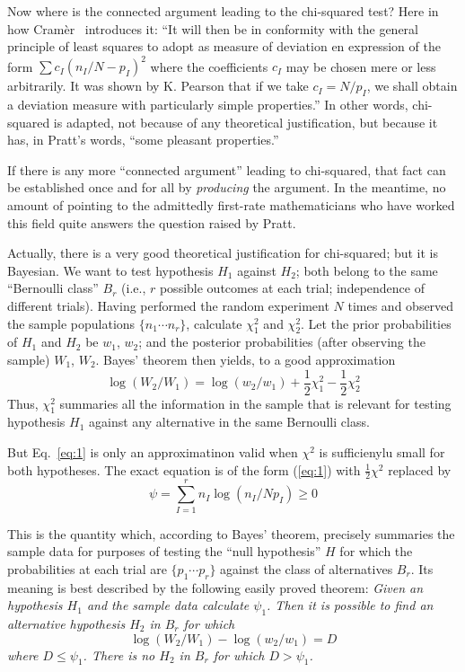 \documentclass[12pt]{article}
\newcommand{\refeq}[1]{Eq.~\ref{#1}}
\newcommand{\refnum}[1]{(\ref{#1})}
\let\oldcite\cite
\renewcommand{\cite}{~\oldcite}
\begin{document}
Now where is the connected argument leading to the chi-squared
test? Here in how Cram\`{e}r\cite{cramer} introduces it: ``It will then be in
conformity with the general principle of least squares to adopt as
measure of deviation en expression of the form $\sum c_I (n_I/N -p_I)^2$ where
the coefficients $c_I$ may be chosen mere or less arbitrarily. It was
shown by K. Pearson that if we take $c_I = N /p_I$, we shall obtain a
deviation measure with particularly simple properties.'' In other words,
chi-squared is adapted, not because of any theoretical justification,
but because it has, in Pratt's words, ``some pleasant properties.''

If there is any more ``connected argument'' leading to chi-squared, that fact can be established once and for all by
\emph{producing} the argument. In the meantime, no amount of pointing to the admittedly first-rate mathematicians who have worked this field quite answers the question raised by Pratt.

Actually, there is a very good theoretical justification for
chi-squared; but it is Bayesian. We want to test hypothesis $H_1$ against $H_2$; both belong to the same ``Bernoulli class'' $B_r$ (i.e., $r$ possible outcomes at each trial; independence of different trials). Having
performed the random experiment $N$ times and observed the sample populations $\{n_1\cdots n_r\}$, calculate $\chi_1^2$ and $\chi_2^2$. Let the prior probabilities of $H_1$ and $H_2$ be $w_1$, $w_2$; and the posterior probabilities (after observing the sample) $W_1$, $W_2$. Bayes' theorem then yields, to a good approximation
\begin{equation}\label{eq:1}
\log(W_2/W_1) = \log(w_2/w_1) + \frac12 \chi_1^2 - \frac12 \chi_2^2
\end{equation}
Thus, $\chi_1^2$ summaries all the information in the sample that is relevant for testing hypothesis $H_1$ against any alternative in the same Bernoulli class.

But \refeq{eq:1} is only an approximatinon valid when $\chi^2$ is sufficienylu small for both hypotheses. The exact equation is of the form \refnum{eq:1} with $\frac12\chi^2$ replaced by
\begin{equation}\label{eq:2}
\psi = \sum_{I=1}^r n_I \log(n_I/N p_I) \ge 0
\end{equation}

This is the quantity which, according to Bayes' theorem, precisely
summaries the sample data for purposes of testing the ``null hypothesis'' $H$ for which the probabilities at each trial are $\{p_1 \cdots p_r\}$ against the class of alternatives $B_r$.
Its meaning is  best described by the following easily proved theorem: \emph{Given an hypothesis $H_1$ and the sample data calculate $\psi_1$. Then it is possible to find an alternative hypothesis $H_2$ in $B_r$ for which
 \begin{equation}\label{eq:3}
\log(W_2/W_1) - \log(w_2/w_1) = D
\end{equation}
where $D\le \psi_1$. There is no $H_2$ in $B_r$ for which $D > \psi_1$.}
\end{document}

